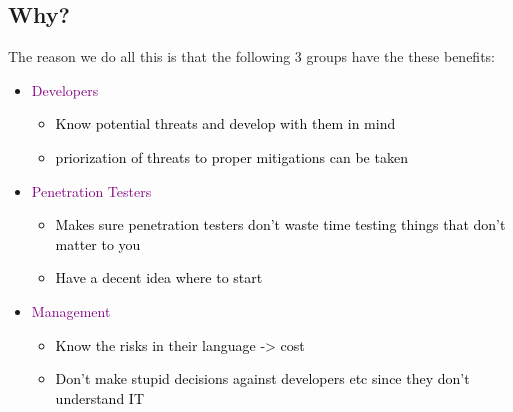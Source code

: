 \documentclass[main.tex,fontsize=8pt,paper=a4,paper=portrait,DIV=calc,]{scrartcl}
\begin{document}
\subsection{Why?}
The reason we do all this is that the following 3 groups have the these benefits: 
\begin{itemize}
\item \textcolor{purple}{Developers}\newline
  \begin{itemize}
  \item \textcolor{black}{Know potential threats and develop with them in mind}
  \item \textcolor{black}{priorization of threats to proper mitigations can be taken}
  \end{itemize} 
\item \textcolor{purple}{Penetration Testers}\newline
  \begin{itemize}
  \item \textcolor{black}{Makes sure penetration testers don't waste time testing things that don't matter to you}
  \item \textcolor{black}{Have a decent idea where to start}
  \end{itemize} 
\item \textcolor{purple}{Management}\newline
  \begin{itemize}
  \item \textcolor{black}{Know the risks in their language -> cost}
  \item \textcolor{black}{Don't make stupid decisions against developers etc since they don't understand IT}
  \end{itemize} 
\end{itemize} 
\end{document}
